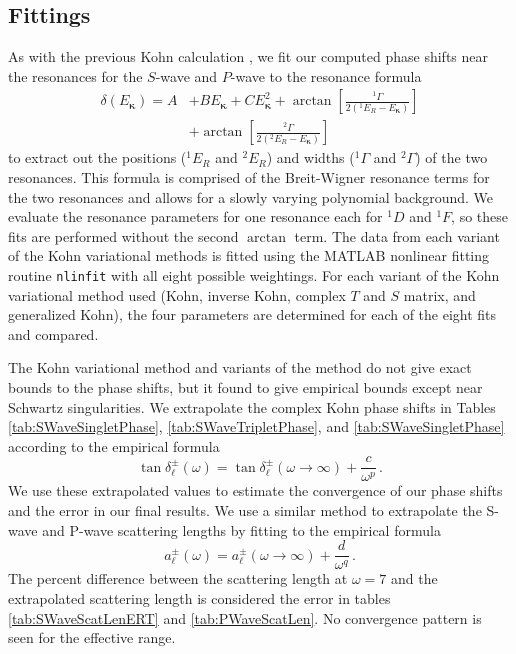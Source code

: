 \documentclass[preprint,showpacs,showkeys,preprintnumbers,amsmath,amssymb,longbibliography,pra,aps]{revtex4-1}
\begin{document}
\subsection{Fittings}
As with the previous Kohn calculation \cite{VanReeth2004},
we fit our computed phase shifts near the resonances for
the $S$-wave and $P$-wave to the resonance formula
\begin{align}
\label{eq:ResonanceFit}
\delta(E_{\bm \kappa}) = A &+ B E_{\bm \kappa} + C E_{\bm \kappa}^2 + \arctan
  \left[ \frac{^1\Gamma}{2(^1E_R - E_{\bm \kappa})} \right]  \nonumber \\
& + \arctan \left[ \frac{^2\Gamma}{2(^2E_R - E_{\bm \kappa})} \right]
\end{align}
to extract out the positions ($^1E_R$ and $^2E_R$) and widths ($^1\Gamma$ and 
$^2\Gamma$) of the two resonances. This formula is comprised of the
Breit-Wigner resonance terms \cite{Breit1936,Macek1970,Hazi1979} for the two
resonances and allows for a slowly varying polynomial background.
We evaluate the resonance parameters for one resonance each for $^1D$ and $^1F$,
so these fits are performed without the second $\arctan$ term.
The data from each variant of the Kohn variational 
methods is fitted using the MATLAB \cite{MATLAB} nonlinear fitting routine 
\texttt{nlinfit} with all eight possible weightings. For each variant of the 
Kohn variational method used (Kohn, inverse Kohn, complex $T$ and $S$ matrix,
and generalized Kohn), the four parameters are determined for each of the 
eight fits and compared.

The Kohn variational method and variants of the method do not give exact
bounds to the phase shifts, but it found to give empirical bounds except
near Schwartz singularities. We extrapolate the complex Kohn phase shifts
in Tables \ref{tab:SWaveSingletPhase}, \ref{tab:SWaveTripletPhase}, and
\ref{tab:SWaveSingletPhase} according to the empirical formula
\cite{Armour1991,VanReeth2003}
\begin{equation}
\label{eq:Extrap}
\tan\delta_\ell^\pm(\omega) = \tan\delta_\ell^\pm(\omega\to\infty) +
  \frac{c}{\omega^p}\, .
\end{equation}
We use these extrapolated values to estimate the convergence of our phase 
shifts and the error in our final results. We use a similar method to
extrapolate the S-wave and P-wave scattering lengths by fitting to the
empirical formula \cite{VanReeth2003}
\begin{equation}
\label{eq:ExtrapA}
a_\ell^\pm(\omega) = a_\ell^\pm(\omega\to\infty) + \frac{d}{\omega^q}\, .
\end{equation}
The percent difference between the scattering length at $\omega = 7$
and the extrapolated scattering 
length is considered the error in tables \ref{tab:SWaveScatLenERT} and
\ref{tab:PWaveScatLen}. No convergence pattern is seen for the effective range.
\end{document}
